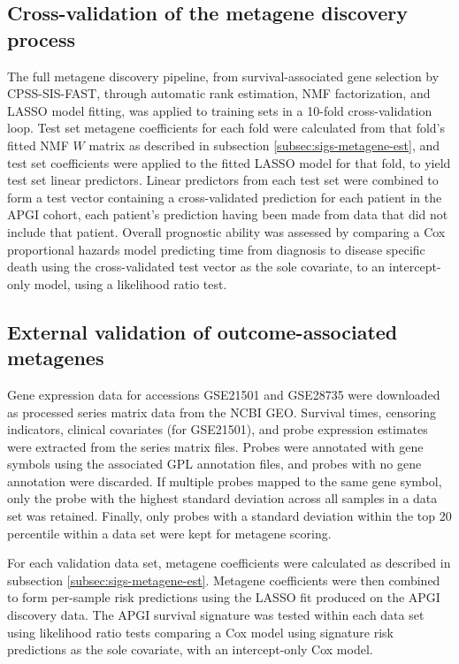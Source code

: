 \documentclass[dissertation.tex]{subfiles}
\begin{document}
\subsection{Cross-validation of the metagene discovery process}
The full metagene discovery pipeline, from survival-associated gene selection by \gls{CPSS}-\gls{SIS}-\gls{FAST}, through automatic rank estimation, \gls{NMF} factorization, and \gls{LASSO} model fitting, was applied to training sets in a 10-fold cross-validation loop.  Test set metagene coefficients for each fold were calculated from that fold's fitted \gls{NMF} $W$ matrix as described in subsection \ref{subsec:sigs-metagene-est}, and test set coefficients were applied to the fitted \gls{LASSO} model for that fold, to yield test set linear predictors.  Linear predictors from each test set were combined to form a test vector containing a cross-validated prediction for each patient in the \gls{APGI} cohort, each patient's prediction having been made from data that did not include that patient.  Overall prognostic ability was assessed by comparing a Cox proportional hazards model predicting time from diagnosis to disease specific death using the cross-validated test vector as the sole covariate, to an intercept-only model, using a likelihood ratio test.

\subsection{External validation of outcome-associated metagenes}
Gene expression data for accessions GSE21501 and GSE28735 were downloaded as processed series matrix data from the \gls{NCBI} \gls{GEO}.  Survival times, censoring indicators, clinical covariates (for GSE21501), and probe expression estimates were extracted from the series matrix files.  Probes were annotated with gene symbols using the associated GPL annotation files, and probes with no gene annotation were discarded.  If multiple probes mapped to the same gene symbol, only the probe with the highest standard deviation across all samples in a data set was retained.  Finally, only probes with a standard deviation within the top 20 percentile within a data set were kept for metagene scoring.

For each validation data set, metagene coefficients were calculated as described in subsection \ref{subsec:sigs-metagene-est}.  Metagene coefficients were then combined to form per-sample risk predictions using the \gls{LASSO} fit produced on the \gls{APGI} discovery data.  The \gls{APGI} survival signature was tested within each data set using likelihood ratio tests comparing a Cox model using signature risk predictions as the sole covariate, with an intercept-only Cox model.
\end{document}
